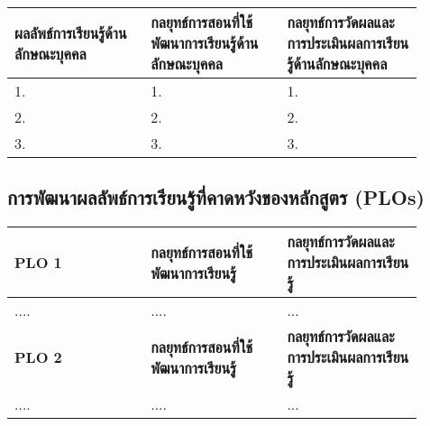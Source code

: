 \begin{landscape}
 \par\noindent\bigskip
 \renewcommand{\arraystretch}{1.3}
 \begin{tabular}{|p{0.3\linewidth}|p{0.3\linewidth}|p{0.3\linewidth}|}
\hline
\textbf{ผลลัพธ์การเรียนรู้ด้านลักษณะบุคคล} & \textbf{กลยุทธ์การสอนที่ใช้พัฒนาการเรียนรู้ด้านลักษณะบุคคล} & \textbf{กลยุทธ์การวัดผลและการประเมินผลการเรียนรู้ด้านลักษณะบุคคล} \\
\hline 
1. & 1. & 1. \\ \hline
2. & 2. & 2. \\ \hline
3. & 3. & 3. \\ \hline
 \end{tabular} 
 
 
\subsection{การพัฒนาผลลัพธ์การเรียนรู้ที่คาดหวังของหลักสูตร (PLOs)}
 
 \par\noindent\bigskip
 \renewcommand{\arraystretch}{1.3}
 \begin{tabular}{|p{0.3\linewidth}|p{0.3\linewidth}|p{0.3\linewidth}|}
 \hline
 \textbf{PLO 1} & \textbf{กลยุทธ์การสอนที่ใช้พัฒนาการเรียนรู้} & \textbf{กลยุทธ์การวัดผลและการประเมินผลการเรียนรู้} \\ 
 \hline
 .... & .... & ... \\
 \hline
  \textbf{PLO 2} & \textbf{กลยุทธ์การสอนที่ใช้พัฒนาการเรียนรู้} & \textbf{กลยุทธ์การวัดผลและการประเมินผลการเรียนรู้} \\ 
 \hline
 .... & .... & ... \\
 \hline
 \end{tabular}
 
 \newpage
 
 
 \newpage
 
 

 \end{landscape}
 
 
 
 
 
 
 
 
 
 
 
 